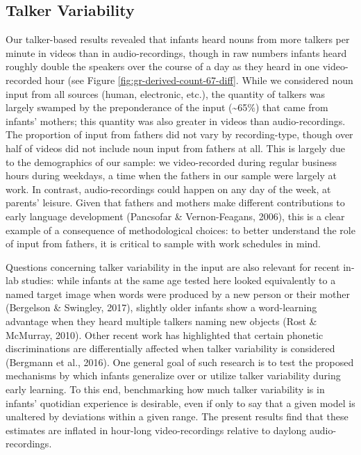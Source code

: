 \documentclass[floatsintext,man]{apa6}
\theoremstyle{definition}
\theoremstyle{definition}
\theoremstyle{definition}
\theoremstyle{remark}
\begin{document}
\hypertarget{talker-variability}{%
\subsection{Talker Variability}\label{talker-variability}}

Our talker-based results revealed that infants heard nouns from more
talkers per minute in videos than in audio-recordings, though in raw
numbers infants heard roughly double the speakers over the course of a
day as they heard in one video-recorded hour (see Figure
\ref{fig:gr-derived-count-67-diff}. While we considered noun input from
all sources (human, electronic, etc.), the quantity of talkers was
largely swamped by the preponderance of the input
(\textasciitilde{}65\%) that came from infants' mothers; this quantity
was also greater in videos than audio-recordings. The proportion of
input from fathers did not vary by recording-type, though over half of
videos did not include noun input from fathers at all. This is largely
due to the demographics of our sample: we video-recorded during regular
business hours during weekdays, a time when the fathers in our sample
were largely at work. In contrast, audio-recordings could happen on any
day of the week, at parents' leisure. Given that fathers and mothers
make different contributions to early language development (Pancsofar \&
Vernon-Feagans, 2006), this is a clear example of a consequence of
methodological choices: to better understand the role of input from
fathers, it is critical to sample with work schedules in mind.

Questions concerning talker variability in the input are also relevant
for recent in-lab studies: while infants at the same age tested here
looked equivalently to a named target image when words were produced by
a new person or their mother (Bergelson \& Swingley, 2017), slightly
older infants show a word-learning advantage when they heard multiple
talkers naming new objects (Rost \& McMurray, 2010). Other recent work
has highlighted that certain phonetic discriminations are differentially
affected when talker variability is considered (Bergmann et al., 2016).
One general goal of such research is to test the proposed mechanisms by
which infants generalize over or utilize talker variability during early
learning. To this end, benchmarking how much talker variability is in
infants' quotidian experience is desirable, even if only to say that a
given model is unaltered by deviations within a given range. The present
results find that these estimates are inflated in hour-long
video-recordings relative to daylong audio-recordings.
\end{document}
